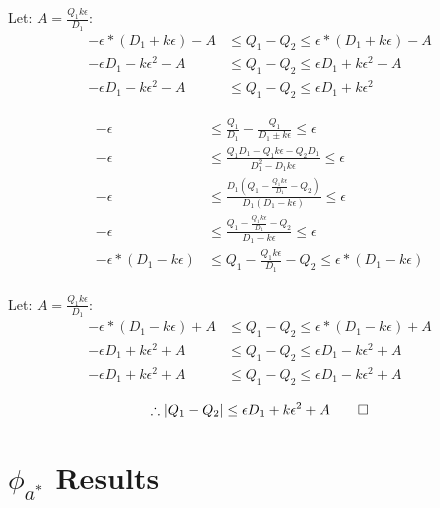 \documentclass[11pt]{amsart}
\begin{document}
Let: $A = \frac{Q_1 k \epsilon}{D_1}$:
\begin{align*}
-\epsilon*(D_1 + k \epsilon) - A &\leq Q_1 - Q_2 \leq \epsilon*(D_1 + k \epsilon) - A \\
-\epsilon D_1 - k \epsilon^2 - A &\leq Q_1 - Q_2 \leq \epsilon D_1 + k \epsilon^2 - A \\
-\epsilon D_1 - k \epsilon^2 - A &\leq Q_1 - Q_2 \leq \epsilon D_1 + k \epsilon^2
\end{align*}


\encircle{-}
\begin{align*}
-\epsilon &\leq \frac{Q_1}{D_1} - \frac{Q_1}{D_1 \pm k\epsilon} \leq \epsilon \\
-\epsilon &\leq \frac{Q_1 D_1 - Q_1 k \epsilon - Q_2 D_1}{D_1^2 - D_1 k \epsilon} \leq \epsilon \\
-\epsilon &\leq \frac{D_1 (Q_1 - \frac{Q_1 k \epsilon}{D_1} - Q_2)}{D_1 (D_1 - k \epsilon)} \leq \epsilon \\
-\epsilon &\leq \frac{Q_1 - \frac{Q_1 k \epsilon}{D_1} - Q_2}{D_1 - k \epsilon} \leq \epsilon \\
-\epsilon*(D_1 - k \epsilon) &\leq Q_1 - \frac{Q_1 k \epsilon}{D_1} - Q_2 \leq \epsilon*(D_1 - k \epsilon) \\
\end{align*}

Let: $A = \frac{Q_1 k \epsilon}{D_1}$:
\begin{align*}
-\epsilon*(D_1 - k \epsilon) + A &\leq Q_1 - Q_2 \leq \epsilon*(D_1 - k \epsilon) + A \\
-\epsilon D_1 + k \epsilon^2 + A &\leq Q_1 - Q_2 \leq \epsilon D_1 - k \epsilon^2 + A \\
-\epsilon D_1 + k \epsilon^2 + A &\leq Q_1 - Q_2 \leq \epsilon D_1 - k \epsilon^2 + A
\end{align*}

\begin{equation}
\therefore |Q_1 - Q_2| \leq \epsilon D_1 + k \epsilon^2 + A \qed
\end{equation}

\newpage
{}

\newpage
\section{$\phi_{a^*}$ Results}




\newpage

\end{document}
